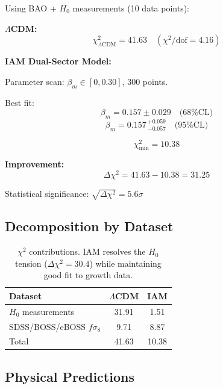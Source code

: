 \documentclass[twocolumn,superscriptaddress,prl,amsmath,amssymb]{revtex4-2}
\begin{document}
Using BAO + $H_0$ measurements (10 data points):

\textbf{$\Lambda$CDM:}
\begin{equation}
\chi^2_{\Lambda\text{CDM}} = 41.63 \quad (\chi^2/\text{dof} = 4.16)
\end{equation}

\textbf{IAM Dual-Sector Model:}

Parameter scan: $\beta_m \in [0, 0.30]$, 300 points.

Best fit:
\begin{equation}
\beta_m = 0.157 \pm 0.029 \quad \text{(68\% CL)}
\end{equation}
\begin{equation}
\beta_m = 0.157\,^{+0.059}_{-0.057} \quad \text{(95\% CL)}
\end{equation}

\begin{equation}
\chi^2_{\min} = 10.38
\end{equation}

\textbf{Improvement:}
\begin{equation}
\Delta\chi^2 = 41.63 - 10.38 = 31.25
\end{equation}

Statistical significance: $\sqrt{\Delta\chi^2} = 5.6\sigma$

\subsection{Decomposition by Dataset}

\begin{table}[h]
\centering
\begin{tabular}{lcc}
\hline\hline
Dataset & $\Lambda$CDM & IAM \\
\hline
$H_0$ measurements & 31.91 & 1.51 \\
SDSS/BOSS/eBOSS $f\sigma_8$ & 9.71 & 8.87 \\
\hline
Total & 41.63 & 10.38 \\
\hline\hline
\end{tabular}
\caption{$\chi^2$ contributions. IAM resolves the $H_0$ tension ($\Delta\chi^2 = 30.4$) while maintaining good fit to growth data.}
\label{tab:chi2_breakdown}
\end{table}

\subsection{Physical Predictions}
\end{document}
